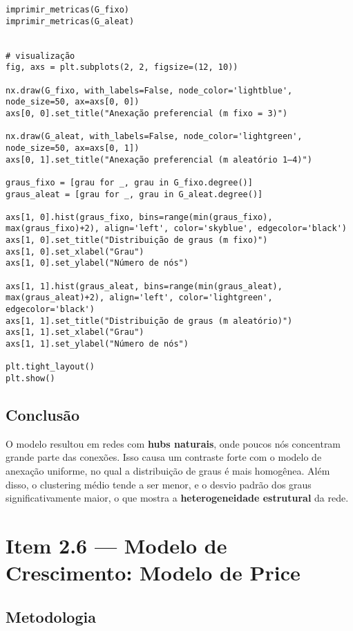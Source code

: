 \documentclass[a4paper]{article}
\begin{document}
\begin{verbatim}
imprimir_metricas(G_fixo)
imprimir_metricas(G_aleat)


# visualização
fig, axs = plt.subplots(2, 2, figsize=(12, 10))

nx.draw(G_fixo, with_labels=False, node_color='lightblue', node_size=50, ax=axs[0, 0])
axs[0, 0].set_title("Anexação preferencial (m fixo = 3)")

nx.draw(G_aleat, with_labels=False, node_color='lightgreen', node_size=50, ax=axs[0, 1])
axs[0, 1].set_title("Anexação preferencial (m aleatório 1–4)")

graus_fixo = [grau for _, grau in G_fixo.degree()]
graus_aleat = [grau for _, grau in G_aleat.degree()]

axs[1, 0].hist(graus_fixo, bins=range(min(graus_fixo), max(graus_fixo)+2), align='left', color='skyblue', edgecolor='black')
axs[1, 0].set_title("Distribuição de graus (m fixo)")
axs[1, 0].set_xlabel("Grau")
axs[1, 0].set_ylabel("Número de nós")

axs[1, 1].hist(graus_aleat, bins=range(min(graus_aleat), max(graus_aleat)+2), align='left', color='lightgreen', edgecolor='black')
axs[1, 1].set_title("Distribuição de graus (m aleatório)")
axs[1, 1].set_xlabel("Grau")
axs[1, 1].set_ylabel("Número de nós")

plt.tight_layout()
plt.show()
\end{verbatim}

\subsection*{Conclusão}

O modelo resultou em redes com \textbf{hubs naturais}, onde poucos nós concentram grande parte das conexões. Isso causa um contraste forte com o modelo de anexação uniforme, no qual a distribuição de graus é mais homogênea.
Além disso, o clustering médio tende a ser menor, e o desvio padrão dos graus significativamente maior, o que mostra a \textbf{heterogeneidade estrutural} da rede.

\newpage

\section*{Item 2.6 — Modelo de Crescimento: Modelo de Price}

\subsection*{Metodologia}
\end{document}
